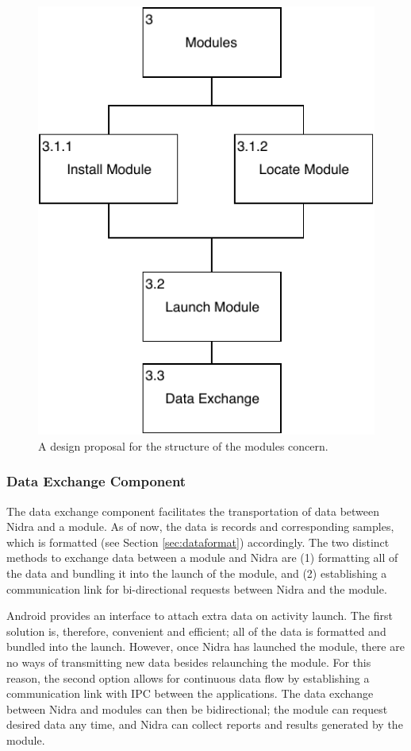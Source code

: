 \begin{figure}[!h]
    \centering
    \includegraphics[scale=0.8]{images/Modules_Design.pdf}
    \caption{A design proposal for the structure of the modules concern.}
    \label{fig:hta_modules}
\end{figure}

\subsubsection{Data Exchange Component}\label{des:des}

The data exchange component facilitates the transportation of data between Nidra and a module. As of now, the data is records and corresponding samples, which is formatted (see Section \ref{sec:dataformat}) accordingly. The two distinct methods to exchange data between a module and Nidra are (1) formatting all of the data and bundling it into the launch of the module, and (2) establishing a communication link for bi-directional requests between Nidra and the module. 

Android provides an interface to attach extra data on activity launch. The first solution is, therefore, convenient and efficient; all of the data is formatted and bundled into the launch. However, once Nidra has launched the module, there are no ways of transmitting new data besides relaunching the module. For this reason, the second option allows for continuous data flow by establishing a communication link with IPC between the applications. The data exchange between Nidra and modules can then be bidirectional; the module can request desired data any time, and Nidra can collect reports and results generated by the module. 

